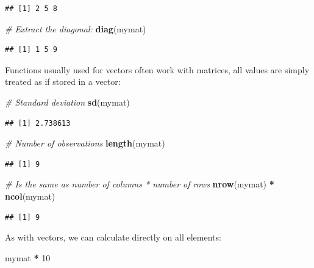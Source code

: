 \documentclass[]{book}
\newenvironment{Shaded}{\begin{snugshade}}{\end{snugshade}}
\newcommand{\CommentTok}[1]{\textcolor[rgb]{0.56,0.35,0.01}{\textit{#1}}}
\newcommand{\DecValTok}[1]{\textcolor[rgb]{0.00,0.00,0.81}{#1}}
\newcommand{\KeywordTok}[1]{\textcolor[rgb]{0.13,0.29,0.53}{\textbf{#1}}}
\newcommand{\NormalTok}[1]{#1}
\newcommand{\OperatorTok}[1]{\textcolor[rgb]{0.81,0.36,0.00}{\textbf{#1}}}
\newcommand{\StringTok}[1]{\textcolor[rgb]{0.31,0.60,0.02}{#1}}
\begin{document}
\begin{verbatim}
## [1] 2 5 8
\end{verbatim}

\begin{Shaded}
\begin{Highlighting}[]
\CommentTok{# Extract the diagonal:}
\KeywordTok{diag}\NormalTok{(mymat)}
\end{Highlighting}
\end{Shaded}

\begin{verbatim}
## [1] 1 5 9
\end{verbatim}

Functions usually used for vectors often work with matrices, all values are simply treated as if stored in a vector:

\begin{Shaded}
\begin{Highlighting}[]
\CommentTok{# Standard deviation}
\KeywordTok{sd}\NormalTok{(mymat)}
\end{Highlighting}
\end{Shaded}

\begin{verbatim}
## [1] 2.738613
\end{verbatim}

\begin{Shaded}
\begin{Highlighting}[]
\CommentTok{# Number of observations}
\KeywordTok{length}\NormalTok{(mymat)}
\end{Highlighting}
\end{Shaded}

\begin{verbatim}
## [1] 9
\end{verbatim}

\begin{Shaded}
\begin{Highlighting}[]
\CommentTok{# Is the same as number of columns * number of rows}
\KeywordTok{nrow}\NormalTok{(mymat) }\OperatorTok{*}\StringTok{ }\KeywordTok{ncol}\NormalTok{(mymat)}
\end{Highlighting}
\end{Shaded}

\begin{verbatim}
## [1] 9
\end{verbatim}

As with vectors, we can calculate directly on all elements:

\begin{Shaded}
\begin{Highlighting}[]
\NormalTok{mymat }\OperatorTok{*}\StringTok{ }\DecValTok{10}
\end{Highlighting}
\end{Shaded}
\end{document}
